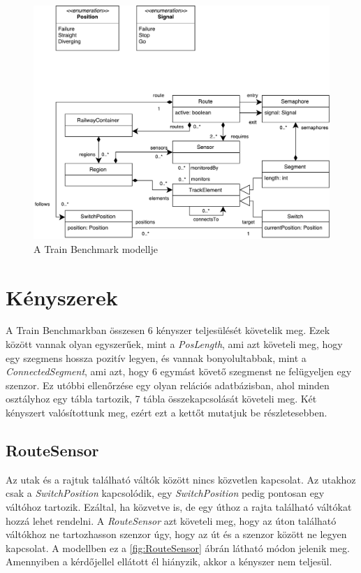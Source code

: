 \begin{figure}[H]
	\includegraphics[width=\linewidth, keepaspectratio]{figures/model.pdf}
	\caption{A Train Benchmark modellje}
	\label{fig:ModelDiagram}
\end{figure}

\section{Kényszerek}

A Train Benchmarkban összesen 6 kényszer teljesülését követelik meg. Ezek között vannak olyan egyszerűek, mint a \emph{PosLength}, ami azt követeli meg, hogy egy szegmens hossza pozitív legyen, és vannak bonyolultabbak, mint a \emph{ConnectedSegment}, ami azt, hogy 6 egymást követő szegmenst ne felügyeljen egy szenzor. Ez utóbbi ellenőrzése egy olyan relációs adatbázisban, ahol minden osztályhoz egy tábla tartozik, 7 tábla összekapcsolását követeli meg.
Két kényszert valósítottunk meg, ezért ezt a kettőt mutatjuk be részletesebben.

\subsection{RouteSensor}

Az utak és a rajtuk található váltók között nincs közvetlen kapcsolat. Az utakhoz csak a \emph{SwitchPosition} kapcsolódik, egy \emph{SwitchPosition} pedig pontosan egy váltóhoz tartozik. Ezáltal, ha közvetve is, de egy úthoz a rajta található váltókat hozzá lehet rendelni. A \emph{RouteSensor} azt követeli meg, hogy az úton található váltókhoz ne tartozhasson szenzor úgy, hogy az út és a szenzor között ne legyen kapcsolat. A modellben ez a \ref{fig:RouteSensor} ábrán látható módon jelenik meg. Amennyiben a kérdőjellel ellátott él hiányzik, akkor a kényszer nem teljesül.

